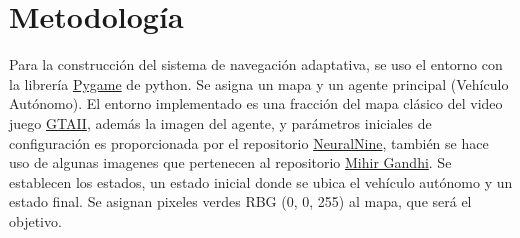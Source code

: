 \documentclass[lettersize, journal]{IEEEtran}
\begin{document}

\section{Metodología}
Para la construcción del sistema de navegación adaptativa, se uso el entorno con la librería \href{https://www.pygame.org/wiki/GettingStarted}{Pygame} de python. Se asigna un mapa y un agente principal (Vehículo Autónomo). El entorno implementado es una fracción del mapa clásico del video juego \href{https://www.rockstargames.com/games/gta2}{GTAII}, además la imagen del agente, y parámetros iniciales de configuración es proporcionada por el repositorio \href{https://github.com/NeuralNine/ai-car-simulation}{NeuralNine}, también se hace uso de algunas imagenes que pertenecen al repositorio \href{https://github.com/mihir-m-gandhi/Traffic-Intersection-Simulation-with-Stats}{Mihir Gandhi}.
Se establecen los estados, un estado inicial donde se ubica el vehículo autónomo y un estado final. Se asignan pixeles verdes RBG (0, 0, 255) al mapa, que será el objetivo.
\end{document}
